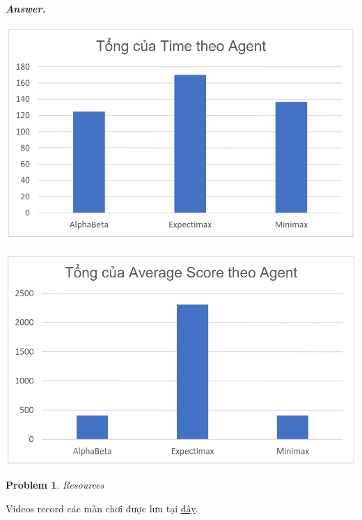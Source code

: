 \documentclass[12pt]{article}
\newtheorem{problem}{Problem}
\newenvironment{solution}[1][\it{Answer}]{\textbf{#1. } }{}
\begin{document}
\begin{solution}
\hspace{-3cm}\begin{minipage}{0.6\textwidth}
    \includegraphics[scale=0.4]{TotalTimeComparison.png}
\end{minipage}
\hspace{0.7cm}\begin{minipage}{0.6\textwidth}
    \includegraphics[scale=0.4]{AverageScoreComparison.png}
\end{minipage}

\end{solution}
\begin{problem}
	Resources
\end{problem}
Videos record các màn chơi được lưu tại \href{https://drive.google.com/drive/folders/1fZ6DTVDw1TYrBAAr6gayBbrj2Y_IdZGl?usp=drive_link}{đây}.
\end{document}
